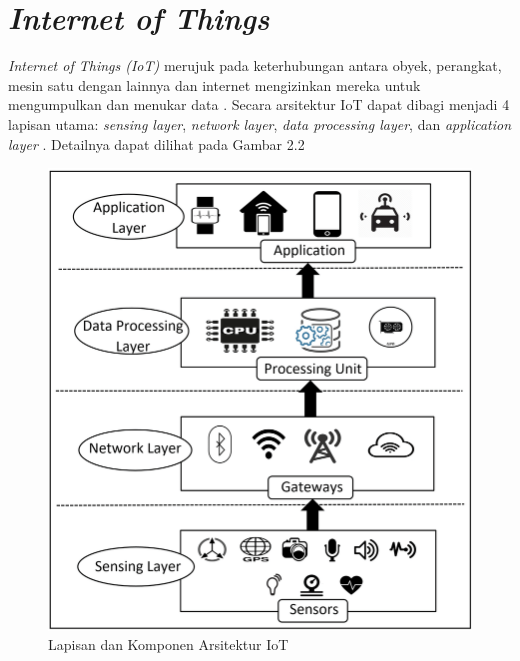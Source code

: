 \section{\textit{Internet of Things}}

\textit{Internet of Things (IoT)} merujuk pada keterhubungan antara obyek, perangkat, mesin satu dengan lainnya dan internet mengizinkan mereka untuk mengumpulkan dan menukar data \parencite{inproc:gazis}. Secara arsitektur IoT dapat dibagi menjadi 4 lapisan utama: \textit{sensing layer}, \textit{network layer}, \textit{data processing layer}, dan \textit{application layer} \parencite{article:sikder}. Detailnya dapat dilihat pada Gambar 2.2

\begin{figure}[ht]
    \includegraphics[width=0.6\linewidth, center]{images/tinjauan-pustaka/fig-iot-architecture.png}
    \caption{Lapisan dan Komponen Arsitektur IoT \parencite{article:sikder}}
    \label{fig:iot-architecture}
\end{figure}

